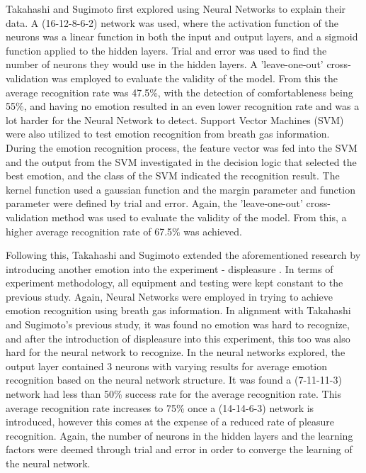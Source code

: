 \documentclass[letterpaper, 10 pt, conference]{ieeeconf}  %
\begin{document}
Takahashi and Sugimoto first explored using Neural Networks to explain their data.  A (16-12-8-6-2) network was used, where the activation function of the neurons was a linear function in both the input and output layers, and a sigmoid function applied to the hidden layers. Trial and error was used to find the number of neurons they would use in the hidden layers. A 'leave-one-out' cross-validation was employed to evaluate the validity of the model. From this the average recognition rate was 47.5\%, with the detection of comfortableness being 55\%, and having no emotion resulted in an even lower recognition rate and was a lot harder for the Neural Network to detect. Support Vector Machines (SVM) were also utilized to test emotion recognition from breath gas information. During the emotion recognition process, the feature vector was fed into the SVM and the output from the SVM investigated in the decision logic that selected the best emotion, and the class of the SVM indicated the recognition result.  The kernel function used a gaussian function and the margin parameter and function parameter were defined by trial and error.  Again, the 'leave-one-out' cross-validation method was used to evaluate the validity of the model. From this, a higher average recognition rate of 67.5\% was achieved.  

Following this, Takahashi and Sugimoto extended the aforementioned research by introducing another emotion into the experiment - displeasure \cite{Takahashi2008}.  In terms of experiment methodology, all equipment and testing were kept constant to the previous study. Again, Neural Networks were employed in trying to achieve emotion recognition using breath gas information. In alignment with Takahashi and Sugimoto's previous study, it was found no emotion was hard to recognize, and after the introduction of displeasure into this experiment, this too was also hard for the neural network to recognize. In the neural networks explored, the output layer contained 3 neurons with varying results for average emotion recognition based on the neural network structure.  It was found a (7-11-11-3) network had less than 50\% success rate for the average recognition rate.  This average recognition rate increases to 75\% once a (14-14-6-3) network is introduced, however this comes at the expense of a reduced rate of pleasure recognition.  Again, the number of neurons in the hidden layers and the learning factors were deemed through trial and error in order to converge the learning of the neural network. 
\end{document}
